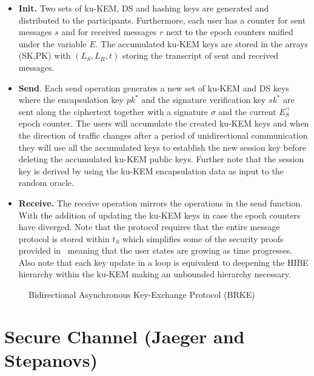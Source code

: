 \documentclass[11pt,a4paper,twoside,openright,bibliography=totoc]{scrbook}
\begin{document}
\begin{itemize}
\item \textbf{Init.} Two sets of ku-KEM, DS and hashing keys are generated
  and distributed to the participants. Furthermore, each user has a counter
  for sent messages $s$ and for received messages $r$ next to the epoch
  counters unified under the variable $E$. The accumulated ku-KEM keys
  are stored in the arrays (SK,PK) with $(L_S,L_R,t)$ storing the transcript
  of sent and received messages.
\item \textbf{Send}. Each send operation generates a new set of
  ku-KEM and DS keys where the encapsulation key $pk^*$ and the
  signature verification key $sk^*$ are sent along the ciphertext
  together with a signature $\sigma$ and the current $E_S^\dashv$ epoch
  counter. The users will
  accumulate the created ku-KEM keys and when the direction
  of traffic changes after a period of unidirectional communication
  they will use all the accumulated keys to establish the new
  session key before deleting the accumulated ku-KEM public keys.
  Further note that the
  session key is derived by using the ku-KEM encapsulation data
  as input to the random oracle.
\item \textbf{Receive.} The receive operation mirrors the
  operations in the send function. With the addition
  of updating the ku-KEM keys in case the epoch counters have diverged.
  Note that the protocol requires that the entire message protocol
  is stored within $t_S$ which simplifies some of the security
  proofs provided in~\cite{poettering2018towards} meaning that
  the user states are growing as time progresses. Also note
  that each key update in a loop is equivalent to deepening
  the HIBE hierarchy within the ku-KEM making an unbounded
  hierarchy necessary.
\end{itemize}

\begin{figure}[p]
  \centering
  \setlength{\fboxsep}{10pt}
  \scalebox{0.9}{%
    \fbox{%
      
    }
  }
  \caption{Bidirectional Asynchronous Key-Exchange Protocol (BRKE)}
  \label{fig:brke}
\end{figure}

\clearpage

\section[Secure Channel (Jaeger and Stepanovs)]
{Secure Channel (Jaeger and Stepanovs)~\cite{jaeger2018optimal}}
\label{sec:jaeger-stepanovs}
\end{document}

